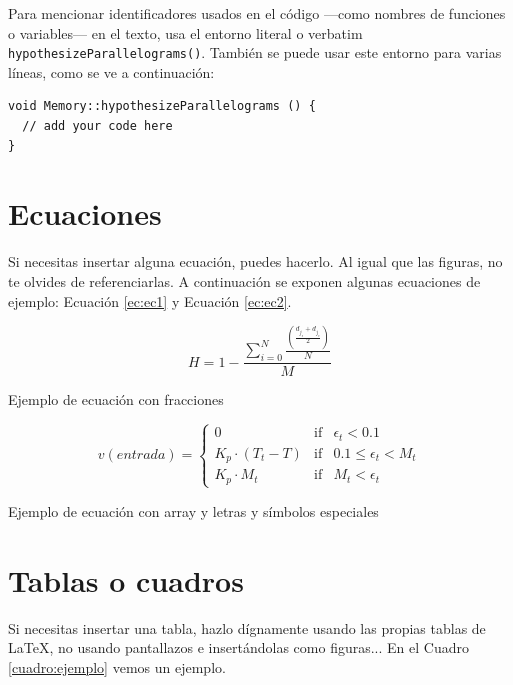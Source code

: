 Para mencionar identificadores usados en el código ---como nombres de funciones o variables--- en el texto, usa el entorno literal o verbatim \verb|hypothesizeParallelograms()|. También se puede usar este entorno para varias líneas, como se ve a continuación:

\begin{verbatim}
void Memory::hypothesizeParallelograms () {
  // add your code here
}
\end{verbatim}

\section{Ecuaciones}

Si necesitas insertar alguna ecuación, puedes hacerlo. Al igual que las figuras, no te olvides de referenciarlas. A continuación se exponen algunas ecuaciones de ejemplo: Ecuación \ref{ec:ec1} y Ecuación \ref{ec:ec2}.

\begin{myequation}[h]
\begin{equation}
H = 1 - \frac{\sum_{i=0}^{N}\frac{(\frac{d_{j_s} + d_{j_e}}{2})}{N}}{M}
\nonumber
\label{ec:ec1}
\end{equation}
\caption[Ejemplo de ecuación con fracciones]{Ejemplo de ecuación con fracciones}
\end{myequation} 

\begin{myequation}[h]
\begin{equation}
v(entrada)= \left\{
	\begin{array}{lcc}
		0 & \mbox{if} & \epsilon_t < 0.1\\
		K_p\cdot{(T_{t}-T)} & \mbox{if}& 0.1 \leq \epsilon_t < M_t\\
		K_p \cdot M_t & \mbox{if}& M_t < \epsilon_t
	\end{array}
\right.
\label{ec:ec2}
\end{equation}
\caption[Ejemplo de ecuación con array y letras y símbolos especiales]{Ejemplo de ecuación con array y letras y símbolos especiales}
\end{myequation}

\section{Tablas o cuadros}

Si necesitas insertar una tabla, hazlo dígnamente usando las propias tablas de \LaTeX, no usando pantallazos e insertándolas como figuras... En el Cuadro \ref{cuadro:ejemplo} vemos un ejemplo.

